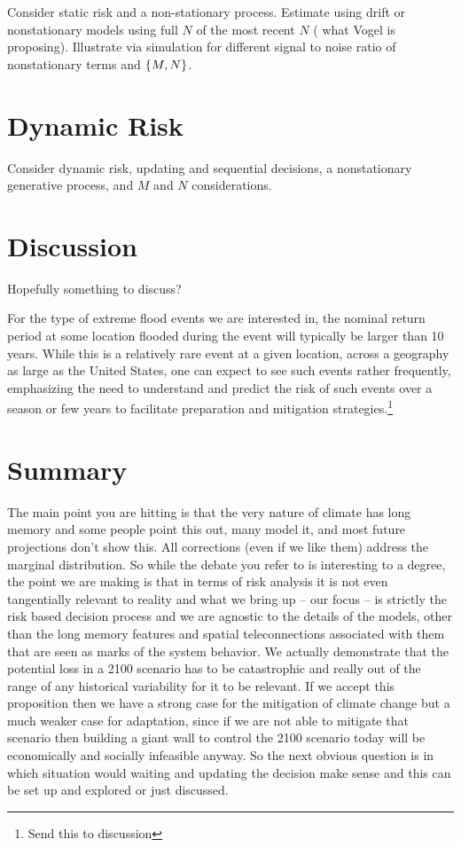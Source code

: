 \documentclass[12pt]{article}
\begin{document}
Consider static risk and a non-stationary process.
Estimate using drift or nonstationary models using full \(N\) of the most recent \(N\) (\ie{} what Vogel is proposing).
Illustrate via simulation for different signal to noise ratio of nonstationary terms and \(\qty{M, N}\).

\section{Dynamic Risk}

Consider dynamic risk, \ie{} updating and sequential decisions, a nonstationary generative process, and \(M\) and \(N\) considerations.

\section{Discussion}

Hopefully something to discuss?

For the type of extreme flood events we are interested in, the nominal return period at some location flooded during the event will typically be larger than 10 years. 
While this is a relatively rare event at a given location, across a geography as large as the United States, one can expect to see such events rather frequently, emphasizing the need to understand and predict the risk of such events over a season or few years to facilitate preparation and mitigation strategies.\footnote{Send this to discussion}

\section{Summary}

The main point you are hitting is that the very nature of climate has long memory and some people point this out, many model it, and most future projections don't show this.
All corrections (even if we like them) address the marginal distribution.
So while the debate you refer to is interesting to a degree, the point we are making is that in terms of risk analysis it is not even tangentially relevant to reality and what we bring up -- our focus -- is strictly the risk based decision process and we are agnostic to the details of the models, other than the long memory features and spatial teleconnections associated with them that are seen as marks of the system behavior.
We actually demonstrate that the potential loss in a 2100 scenario has to be catastrophic and really out of the range of any historical variability for it to be relevant. 
If we accept this proposition then we have a strong case for the mitigation of climate change but a much weaker case for adaptation, since if we are not able to mitigate that scenario then building a giant wall to control the 2100 scenario today will be economically and socially infeasible anyway. 
So the next obvious question is in which situation would waiting and updating the decision make sense and this can be set up and explored or just discussed.
\end{document}
